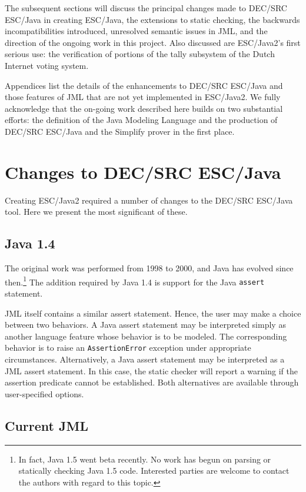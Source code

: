 \documentclass{llncs}
\begin{document}
The subsequent sections will discuss the principal changes made to
DEC/SRC ESC/Java in creating ESC/Java, the extensions to static
checking, the backwards incompatibilities introduced, unresolved
semantic issues in JML, and the direction of the ongoing work in this
project.  Also discussed are ESC/Java2's first serious use: the
verification of portions of the tally subsystem of the Dutch Internet
voting system.

Appendices list the details of the enhancements to DEC/SRC ESC/Java
and those features of JML that are not yet implemented in ESC/Java2.
We fully acknowledge that the on-going work described here builds on
two substantial efforts: the definition of the Java Modeling Language
and the production of DEC/SRC ESC/Java and the Simplify prover in the
first place.

\section{Changes to DEC/SRC ESC/Java}

Creating ESC/Java2 required a number of changes to the DEC/SRC
ESC/Java tool.  Here we present the most significant of these.

\subsection{Java 1.4}

The original work was performed from 1998 to 2000, and Java has
evolved since then.\footnote{In fact, Java 1.5 went beta recently.  No
  work has begun on parsing or statically checking Java 1.5 code.
  Interested parties are welcome to contact the authors with regard to
  this topic.}  The addition required by Java 1.4 is support for the
Java {\tt assert} statement.

JML itself contains a similar assert statement.  Hence, the user may
make a choice between two behaviors.  A Java assert statement may be
interpreted simply as another language feature whose behavior is to be
modeled.  The corresponding behavior is to raise an
\texttt{AssertionError} exception under appropriate circumstances.
Alternatively, a Java assert statement may be interpreted as a JML
assert statement.  In this case, the static checker will report a
warning if the assertion predicate cannot be established.  Both
alternatives are available through user-specified options.

\subsection{Current JML}
\end{document}
